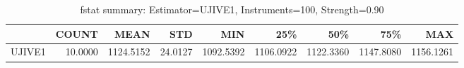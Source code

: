 \begin{table}[ht]
\centering
\caption{fstat summary: Estimator=UJIVE1, Instruments=100, Strength=0.90}
\begin{tabular}{lrrrrrrrr}
\toprule
 & COUNT & MEAN & STD & MIN & 25\% & 50\% & 75\% & MAX \\
\midrule
UJIVE1 & 10.0000 & 1124.5152 & 24.0127 & 1092.5392 & 1106.0922 & 1122.3360 & 1147.8080 & 1156.1261 \\
\bottomrule
\end{tabular}
\end{table}
